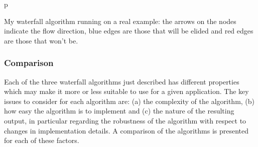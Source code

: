 \begin{stusubfig}{p}
	\hspace{4mm}%
\caption[My waterfall algorithm running on a real example]{My waterfall algorithm running on a real example: the arrows on the nodes indicate the flow direction, blue edges are those that will be elided and red edges are those that won't be.}
\label{fig:segmentation-waterfall-smg-example}
\end{stusubfig}


\subsubsection{Comparison}
\label{subsubsec:segmentation-waterfall-comparison}

Each of the three waterfall algorithms just described has different properties which may make it more or less suitable to use for a given application. The key issues to consider for each algorithm are: (a) the complexity of the algorithm, (b) how easy the algorithm is to implement and (c) the nature of the resulting output, in particular regarding the robustness of the algorithm with respect to changes in implementation details. A comparison of the algorithms is presented for each of these factors.

